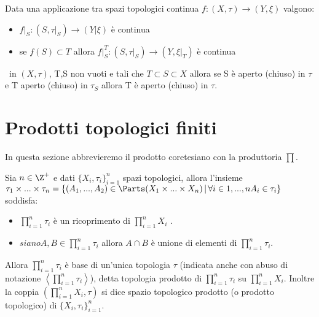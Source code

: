 \documentclass[a4paper]{article}
\begin{document}
\begin{prop}
Data una applicazione tra spazi topologici continua $f:(X,\tau) \to (Y,\xi )$ valgono:
\begin{itemize}
 	\item $f|_S : (S, \tau|_S) \to (Y|\xi) $ è continua
	\item se $f(S) \subset T $ allora $f|_S^T : (S, \tau|_S) \to (Y, \xi|_T) $ è continua
\end{itemize}
\end{prop}

\begin{oss} in $(X,\tau)$, T,S non vuoti e tali che $T\subset S \subset X$ allora se S è aperto (chiuso) in $\tau$ e T aperto (chiuso) in $\tau_S$ allora T è aperto (chiuso) in $\tau$.
\end{oss}

\section{Prodotti topologici finiti}
In questa sezione abbrevieremo il prodotto coretesiano con la produttoria $\prod $.
\begin{prop}
	Sia $ n \in \Z ^+$ e dati $\{ X_i , \tau_i \}_{i=1}^n $ spazi topologici, allora l'insieme $\tau_1 \times ... \times \tau_n = \{ (A_1, ... , A_2) \in \Parts(X_1 \times ... \times X_n ) \, | \, \forall i \in {1,...,n} A_i \in \tau_i \}$ soddisfa: 
	\begin{itemize}
		\item  $\prod_{i=1}^{n} \tau_i $ è un ricoprimento di $\prod_{i=1}^n X_i$ .
		\item $siano A,B \in \prod_{i=1}^{n} \tau_i $ allora $A \cap B $ è unione di elementi di $\prod_{i=1}^{n} \tau_i $.
	\end{itemize}
Allora $\prod_{i=1}^{n} \tau_i $ è base di un'unica topologia $\tau$ (indicata anche con abuso di notazione $\left \langle \prod_{i=1}^{n} \tau_i  \right \rangle $), detta topologia prodotto di $\prod_{i=1}^{n} \tau_i $ su $\prod_{i=1}^{n} X_i $. Inoltre la coppia $(\prod_{i=1}^{n} X_i ,\tau )$ si dice spazio topologico prodotto (o prodotto topologico) di $\{ X_i , \tau_i \}_{i=1}^n $.
	
\end{prop}
\end{document}
